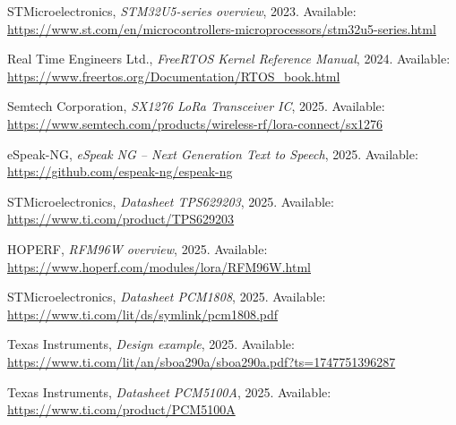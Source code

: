 \begin{thebibliography}{1}
STMicroelectronics,
\textit{STM32U5-series overview},
2023.
Available: \url{https://www.st.com/en/microcontrollers-microprocessors/stm32u5-series.html}

Real Time Engineers Ltd.,
\textit{FreeRTOS Kernel Reference Manual},
2024.
Available: \url{https://www.freertos.org/Documentation/RTOS_book.html}

Semtech Corporation,
\textit{SX1276 LoRa Transceiver IC},
2025.
Available: \url{https://www.semtech.com/products/wireless-rf/lora-connect/sx1276}

eSpeak-NG, 
\textit{eSpeak NG -- Next Generation Text to Speech}, 
2025. 
Available: \url{https://github.com/espeak-ng/espeak-ng}

STMicroelectronics,
\textit{Datasheet TPS629203}, 
2025. 
Available: \url{https://www.ti.com/product/TPS629203}

HOPERF,
\textit{RFM96W overview}, 
2025. 
Available: \url{https://www.hoperf.com/modules/lora/RFM96W.html}

STMicroelectronics,
\textit{Datasheet PCM1808}, 
2025. 
Available: \url{https://www.ti.com/lit/ds/symlink/pcm1808.pdf}

Texas Instruments,
\textit{Design example}, 
2025. 
Available: \url{https://www.ti.com/lit/an/sboa290a/sboa290a.pdf?ts=1747751396287}

Texas Instruments,
\textit{Datasheet PCM5100A}, 
2025. 
Available: \url{https://www.ti.com/product/PCM5100A}





\end{thebibliography}
